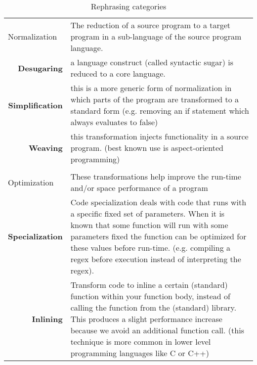 \begin{table}[h]
\centering
\caption{Rephrasing categories}
\def\arraystretch{1.5}
\label{table-rephrasing-categories}
\begin{tabular}{p{0.2\linewidth}p{0.8\linewidth}}
\multicolumn{1}{l}{Normalization} & The reduction of a source program to a target program in a sub-language of the source program language.                                                                                                                                                                               
\\
\multicolumn{1}{r}{\bf Desugaring}                  & a language construct (called syntactic sugar) is reduced to a core language.                                                    \\
\multicolumn{1}{r}{\bf Simplification}              & this is a more generic form of normalization in which parts of the program are transformed to a standard form (e.g. removing an if statement which always evaluates to false) \\
\multicolumn{1}{r}{\bf Weaving}                     & this transformation injects functionality in a source program. (best known use is aspect-oriented programming\cite{})                                                                                                                                                                               \\
\\
\multicolumn{1}{l}{Optimization}  & These transformations help improve the run-time and/or space performance of a program                                                                                         \\
\multicolumn{1}{r}{\bf Specialization}              & Code specialization deals with code that runs with a specific fixed set of parameters. When it is known that some function will run with some parameters fixed the function can be optimized for these values before run-time. (e.g. compiling a regex before execution instead of interpreting the regex).                                                                                                                                                                               \\
\multicolumn{1}{r}{\bf Inlining}                    & Transform code to inline a certain (standard) function within your function body, instead of calling the function from the (standard) library. This produces a slight performance increase because we avoid an additional function call. (this technique is more common in lower level programming languages like C or C++)                                                                                                                                                                              \\

\end{tabular}
\end{table}
